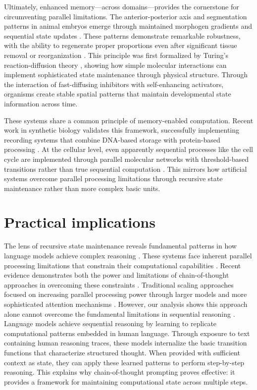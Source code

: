 \documentclass[12pt]{article}
\begin{document}
Ultimately, enhanced memory—across domains—provides the cornerstone for circumventing parallel limitations.
The anterior-posterior axis and segmentation patterns in animal embryos emerge through maintained morphogen gradients and sequential state updates \cite{pastor2020computation}.
These patterns demonstrate remarkable robustness, with the ability to regenerate proper proportions even after significant tissue removal or reorganization \cite{lobo2012towards}.
This principle was first formalized by Turing's reaction-diffusion theory \cite{turing1952chemical}, showing how simple molecular interactions can implement sophisticated state maintenance through physical structure.
Through the interaction of fast-diffusing inhibitors with self-enhancing activators, organisms create stable spatial patterns that maintain developmental state information across time.

These systems share a common principle of memory-enabled computation.
Recent work in synthetic biology validates this framework, successfully implementing recording systems that combine DNA-based storage with protein-based processing \cite{sheth2017multiplex}.
At the cellular level, even apparently sequential processes like the cell cycle are implemented through parallel molecular networks with threshold-based transitions rather than true sequential computation \cite{alberts2022molecular}.
This mirrors how artificial systems overcome parallel processing limitations through recursive state maintenance rather than more complex basic units.

\section{Practical implications}

The lens of recursive state maintenance reveals fundamental patterns in how language models achieve complex reasoning \cite{dickson2024trust,ahn2024recursive,openai2024o1}.
These systems face inherent parallel processing limitations that constrain their computational capabilities \cite{merrill2023parallelism}.
Recent evidence demonstrates both the power and limitations of chain-of-thought approaches in overcoming these constraints \cite{liu2024mind}.
Traditional scaling approaches focused on increasing parallel processing power through larger models and more sophisticated attention mechanisms \cite{shallue2019measuring}.
However, our analysis shows this approach alone cannot overcome the fundamental limitations in sequential reasoning \cite{peng2024limitations}.
Language models achieve sequential reasoning by learning to replicate computational patterns embedded in human language.
Through exposure to text containing human reasoning traces, these models internalize the basic transition functions that characterize structured thought.
When provided with sufficient context as state, they can apply these learned patterns to perform step-by-step reasoning.
This explains why chain-of-thought prompting proves effective: it provides a framework for maintaining computational state across multiple steps.
\end{document}
